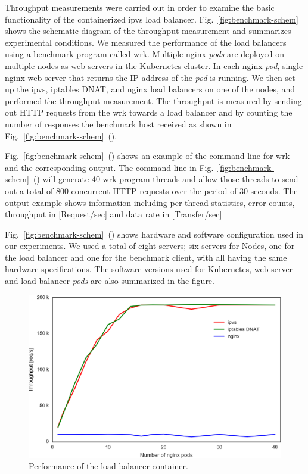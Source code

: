 Throughput measurements were carried out in order to examine the basic functionality of the containerized ipvs load balancer.
Fig.~\ref{fig:benchmark-schem} shows the schematic diagram of the throughput measurement and summarizes experimental conditions.
We measured the performance of the load balancers using a benchmark program called wrk\cite{Glozer2016}.
Multiple nginx {\em pods} are deployed on multiple nodes as web servers in the Kubernetes cluster.
In each nginx {\em pod}, single nginx web server that returns the IP address of the {\em pod} is running.
We then set up the ipvs, iptables DNAT, and nginx load balancers on one of the nodes, and performed the throughput measurement.
The throughput is measured by sending out HTTP requests from the wrk towards a load balancer and by counting the number of responses the benchmark host received as shown in Fig.~\ref{fig:benchmark-schem}~().

Fig.~\ref{fig:benchmark-schem}~() shows an example of the command-line for wrk and the corresponding output.
The command-line in Fig.~\ref{fig:benchmark-schem}~() will generate 40 wrk program threads
and allow those threads to send out a total of 800 concurrent HTTP requests over the period of 30 seconds.
The output example shows information including per-thread statistics, error counts, throughput in [Request/sec] and data rate in [Transfer/sec]

Fig.~\ref{fig:benchmark-schem}~() shows hardware and software configuration used in our experiments.
We used a total of eight servers; six servers for Nodes, one for the load balancer and one for the benchmark client, with all having the same hardware specifications.
The software versions used for Kubernetes, web server and load balancer {\em pods} are also summarized in the figure.

\begin{figure}[t]
  \includegraphics[width=0.9\columnwidth]{Figs/ipvs-iptables-nginx}
  \caption{Performance of the load balancer container.}
  \label{fig:ipvs-iptables-nginx}
\end{figure}


